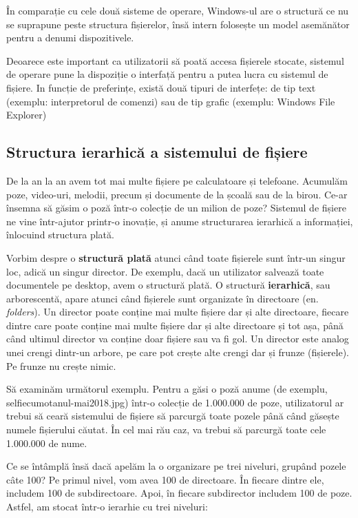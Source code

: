 În comparație cu cele două sisteme de operare, Windows-ul are o structură ce nu
se suprapune peste structura fișierelor, însă intern folosește un model
asemănător pentru a denumi dispozitivele.

Deoarece este important ca utilizatorii să poată accesa fișierele stocate,
sistemul de operare pune la dispoziție o interfață pentru a putea lucra cu
sistemul de fișiere. In funcție de preferințe, există două tipuri de interfețe:
de tip text (exemplu: interpretorul de comenzi) sau de tip grafic (exemplu:
Windows File Explorer)

\subsection{Structura ierarhică a sistemului de fișiere}
\label{sec:file-system-baza-struct}

De la an la an avem tot mai multe fișiere pe calculatoare și telefoane. Acumulăm
poze, video-uri, melodii, precum și documente de la școală sau de la birou.
Ce-ar însemna să găsim o poză într-o colecție de un milion de poze? Sistemul de
fișiere ne vine într-ajutor printr-o inovație, și anume structurarea ierarhică a
informației, înlocuind structura plată.

Vorbim despre o \textbf{structură plată} atunci când toate fișierele sunt
într-un singur loc, adică un singur director. De exemplu, dacă un utilizator
salvează toate documentele pe desktop, avem o structură plată. O structură
\textbf{ierarhică}, sau arborescentă, apare atunci când fișierele sunt
organizate în directoare (en. \textit{folders}). Un director poate conține mai
multe fișiere dar și alte directoare, fiecare dintre care poate conține mai
multe fișiere dar și alte directoare și tot așa, până când  ultimul director va
conține doar fișiere sau va fi gol. Un director este analog unei crengi dintr-un
arbore, pe care pot crește alte crengi dar și frunze (fișierele). Pe frunze nu
crește nimic.

Să examinăm următorul exemplu. Pentru a găsi o poză anume (de exemplu,
selfiecumotanul-mai2018.jpg) într-o colecție de 1.000.000 de poze, utilizatorul
ar trebui să ceară sistemului de fișiere să parcurgă toate pozele până când
găsește numele fișierului căutat. În cel mai rău caz, va trebui să parcurgă
toate cele 1.000.000 de nume.

Ce se întâmplă însă dacă apelăm la o organizare pe trei niveluri, grupând pozele
câte 100? Pe primul nivel, vom avea 100 de directoare. În fiecare dintre ele,
includem 100 de subdirectoare. Apoi, în fiecare subdirector includem 100 de
poze. Astfel, am stocat într-o ierarhie cu trei niveluri:

